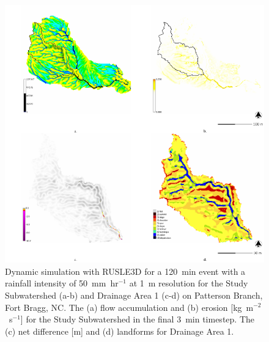 \documentclass[gmd, manuscript]{copernicus}
\providecommand{\DIFadd}[1]{{\protect\color{blue} \sf #1}} %
\providecommand{\DIFaddbegin}{} %
\providecommand{\DIFaddend}{} %
\begin{document}
\DIFaddbegin
\DIFadd{
\begin{figure}
\center
\includegraphics[width=\textwidth,height=0.925\textheight,keepaspectratio]{figures/rusle.pdf}
\caption{Dynamic simulation with RUSLE3D 
for a 120~\unit{min} event 
with a rainfall intensity of 50~\unit{mm~hr}$^{-1}$
at 1~\unit{m} resolution for
the Study Subwatershed (a-b)
and Drainage Area 1 (c-d)
on Patterson Branch, Fort Bragg, NC.
The (a) flow accumulation  and
(b) erosion [\unit{kg~m}$^{-2}$~\unit{s}$^{-1}$]
for the Study Subwatershed in the final 3~\unit{min} timestep.
The (c) net difference [\unit{m}] and (d) landforms 
for Drainage Area 1.
}
\label{fig:rusle_simulation}
\end{figure}
}
\DIFaddend
\end{document}
